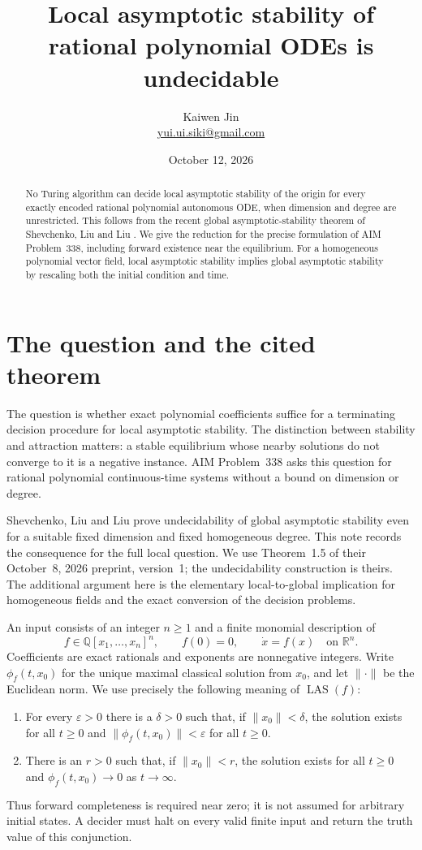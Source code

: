 \documentclass[11pt]{article}
\title{Local asymptotic stability of rational polynomial ODEs is undecidable}
\author{Kaiwen Jin\\\small\href{mailto:yui.ui.siki@gmail.com}{yui.ui.siki@gmail.com}}
\date{October 12, 2026}
\newcommand{\R}{\mathbb R}
\newcommand{\Q}{\mathbb Q}
\newcommand{\LAS}{\operatorname{LAS}}
\begin{document}
\maketitle

\begin{abstract}
No Turing algorithm can decide local asymptotic stability of the origin for
every exactly encoded rational polynomial autonomous ODE, when dimension and
degree are unrestricted. This follows from the recent global
asymptotic-stability theorem of Shevchenko, Liu and Liu
\cite{SLL}. We give the reduction for the precise formulation of AIM
Problem~338, including forward existence near the equilibrium. For a
homogeneous polynomial vector field, local asymptotic stability implies global
asymptotic stability by rescaling both the initial condition and time.
\end{abstract}

\section{The question and the cited theorem}

The question is whether exact polynomial coefficients suffice for a terminating
decision procedure for local asymptotic stability. The distinction between
stability and attraction matters: a stable equilibrium whose nearby solutions
do not converge to it is a negative instance. AIM Problem~338
\cite{AIM338} asks this question for rational polynomial continuous-time
systems without a bound on dimension or degree.

Shevchenko, Liu and Liu \cite{SLL} prove undecidability of global asymptotic
stability even for a suitable fixed dimension and fixed homogeneous degree.
This note records the consequence for the full local question. We use
Theorem~1.5 of their October~8, 2026 preprint, version~1; the undecidability
construction is theirs. The additional argument here is the elementary
local-to-global implication for homogeneous fields and the exact conversion
of the decision problems.

An input consists of an integer $n\geq1$ and a finite monomial description of
\[
  f\in\Q[x_1,\ldots,x_n]^n,\qquad f(0)=0,
  \qquad \dot x=f(x)\quad\text{on }\R^n.
\]
Coefficients are exact rationals and exponents are nonnegative integers.
Write $\phi_f(t,x_0)$ for the unique maximal classical solution from $x_0$,
and let $\|\cdot\|$ be the Euclidean norm. We use precisely the following
meaning of $\LAS(f)$:
\begin{enumerate}[label=(\roman*),leftmargin=*]
\item For every $\varepsilon>0$ there is a $\delta>0$ such that, if
$\|x_0\|<\delta$, the solution exists for all $t\geq0$ and
$\|\phi_f(t,x_0)\|<\varepsilon$ for all $t\geq0$.
\item There is an $r>0$ such that, if $\|x_0\|<r$, the solution exists for
all $t\geq0$ and $\phi_f(t,x_0)\to0$ as $t\to\infty$.
\end{enumerate}
Thus forward completeness is required near zero; it is not assumed for
arbitrary initial states. A decider must halt on every valid finite input and
return the truth value of this conjunction.
\end{document}
